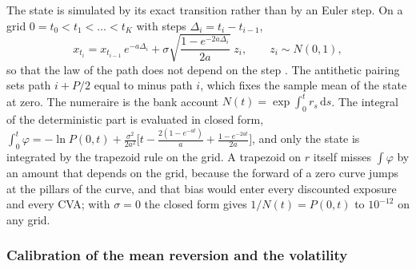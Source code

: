 The state is simulated by its exact transition rather than by an Euler step. On a grid $0=t_0<t_1<\dots<t_K$ with steps
$\Delta_i=t_i-t_{i-1}$,
\begin{equation}
x_{t_i}=x_{t_{i-1}}\,e^{-a\Delta_i}+\sigma\sqrt{\frac{1-e^{-2a\Delta_i}}{2a}}\;z_i,\qquad z_i\sim N(0,1),
\label{eq:ccr-exact}
\end{equation}
so that the law of the path does not depend on the step \citep{ccr:brigo2008}. The antithetic pairing sets path $i+P/2$ equal to minus path
$i$, which fixes the sample mean of the state at zero. The
numeraire is the bank account $N(t)=\exp\int_0^t r_s\,\mathrm{d}s$. The integral of the deterministic part is evaluated in closed form,
$\int_0^t\varphi=-\ln P(0,t)+\frac{\sigma^2}{2a^2}\big[t-\tfrac{2(1-e^{-at})}{a}+\tfrac{1-e^{-2at}}{2a}\big]$, and only the state is
integrated by the trapezoid rule on the grid. A trapezoid on $r$ itself misses $\int\varphi$ by an amount that depends on the grid, because the
forward of a zero curve jumps at the pillars of the curve, and that bias would enter every discounted exposure and every CVA; with
$\sigma=0$ the closed form gives $1/N(t)=P(0,t)$ to $10^{-12}$ on any grid.

\subsubsection{Calibration of the mean reversion and the volatility}

